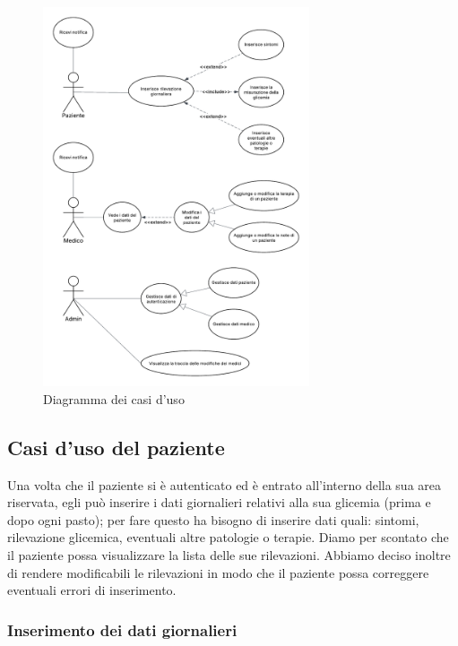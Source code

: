 \documentclass[a4paper]{article}
\begin{document}
\begin{figure}[H]
  \centering
  \includegraphics[width=0.7\textwidth]{usecase}
  \caption{Diagramma dei casi d'uso}
  \label{fig:usecase}
\end{figure}

\subsection{Casi d'uso del paziente}

Una volta che il paziente si è autenticato ed è entrato all'interno della sua area riservata, egli può
inserire i dati giornalieri relativi alla sua glicemia (prima e dopo ogni pasto); per fare questo
ha bisogno di inserire dati quali: sintomi, rilevazione glicemica, eventuali altre patologie o terapie.
Diamo per scontato che il paziente possa visualizzare 
la lista delle sue rilevazioni.
Abbiamo deciso inoltre di rendere modificabili le rilevazioni in modo che il 
paziente possa correggere eventuali errori di inserimento.

\subsubsection{Inserimento dei dati giornalieri}
\end{document}

